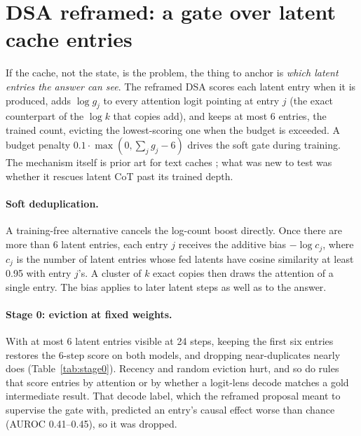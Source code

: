 \documentclass[11pt]{article}
\begin{document}
\section{DSA reframed: a gate over latent cache entries}
\label{sec:gate}

If the cache, not the state, is the problem, the thing to anchor is \emph{which latent entries the answer can see}. The
reframed DSA scores each latent entry when it is produced, adds $\log g_j$ to every attention logit pointing at entry $j$ (the
exact counterpart of the $\log k$ that copies add), and keeps at most 6 entries, the trained count, evicting the
lowest-scoring one when the budget is exceeded. A budget penalty $0.1 \cdot \max(0, \sum_j g_j - 6)$ drives the soft gate
during training. The mechanism itself is prior art for text caches
\citep{trimkv2026, leviathan2025selective, lin2025fox}; what was new to test was whether it rescues latent CoT past its
trained depth.

\paragraph{Soft deduplication.} A training-free alternative cancels the log-count boost directly. Once there are more than 6
latent entries, each entry $j$ receives the additive bias $-\log c_j$, where $c_j$ is the number of latent entries whose fed
latents have cosine similarity at least 0.95 with entry $j$'s. A cluster of $k$ exact copies then draws the attention of a
single entry. The bias applies to later latent steps as well as to the answer.

\paragraph{Stage 0: eviction at fixed weights.} With at most 6 latent entries visible at 24 steps, keeping the first six
entries restores the 6-step score on both models, and dropping near-duplicates nearly does (Table~\ref{tab:stage0}). Recency
and random eviction hurt, and so do rules that score entries by attention or by whether a logit-lens decode matches a gold
intermediate result. That decode label, which the reframed proposal meant to supervise the gate with, predicted an entry's
causal effect worse than chance (AUROC 0.41--0.45), so it was dropped.
\end{document}
